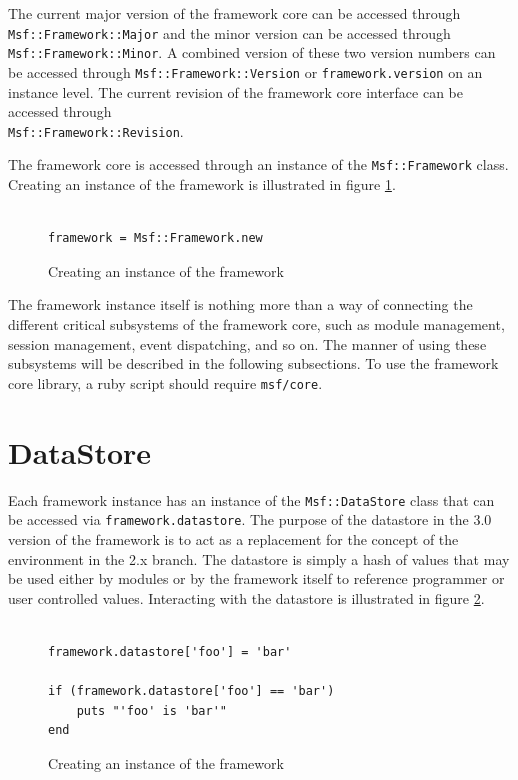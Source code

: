 \documentclass{report}
\begin{document}
\par
The current major version of the framework core can be accessed
through \texttt{Msf::Framework::Major} and the minor version can be
accessed through \texttt{Msf::Framework::Minor}.  A combined version
of these two version numbers can be accessed through
\texttt{Msf::Framework::Version} or \texttt{framework.version} on an
instance level.  The current revision of the framework core
interface can be accessed through
\\\texttt{Msf::Framework::Revision}.

\par
The framework core is accessed through an instance of the
\texttt{Msf::Framework} class.  Creating an instance of the
framework is illustrated in figure \ref{fig-code-framework-create}.

\begin{figure}[h]
\begin{verbatim}

framework = Msf::Framework.new
\end{verbatim}
\caption{Creating an instance of the framework}
\label{fig-code-framework-create}
\end{figure}

\par
The framework instance itself is nothing more than a way of
connecting the different critical subsystems of the framework core,
such as module management, session management, event dispatching,
and so on.  The manner of using these subsystems will be described
in the following subsections.  To use the framework core library, a
ruby script should require \texttt{msf/core}.

    \section{DataStore}

\par
Each framework instance has an instance of the
\texttt{Msf::DataStore} class that can be accessed via
\texttt{framework.datastore}.  The purpose of the datastore in the
3.0 version of the framework is to act as a replacement for the
concept of the environment in the 2.x branch.  The datastore is
simply a hash of values that may be used either by modules or by the
framework itself to reference programmer or user controlled values.
Interacting with the datastore is illustrated in figure
\ref{fig-code-framework-datastore}.

\begin{figure}[h]
\begin{verbatim}

framework.datastore['foo'] = 'bar'

if (framework.datastore['foo'] == 'bar')
    puts "'foo' is 'bar'"
end
\end{verbatim}
\caption{Creating an instance of the framework}
\label{fig-code-framework-datastore}
\end{figure}
\end{document}
